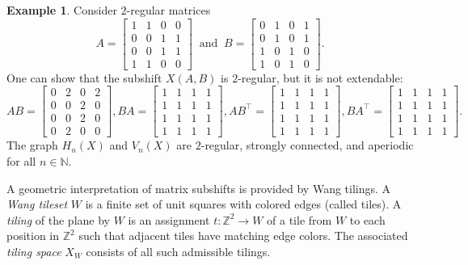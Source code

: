 \documentclass[12pt]{article}
\theoremstyle{definition}
\newtheorem{example}{Example}
\begin{document}
\begin{example}
Consider $2$-regular matrices
\[
A = \begin{bmatrix}
1 & 1 & 0 & 0 \\
0 & 0 & 1 & 1 \\
0 & 0 & 1 & 1 \\
1 & 1 & 0 & 0
\end{bmatrix} \ \mbox{ and } \
B = \begin{bmatrix}
0 & 1 & 0 & 1 \\
0 & 1 & 0 & 1 \\
1 & 0 & 1 & 0 \\
1 & 0 & 1 & 0
\end{bmatrix}.
\]
One can show that the subshift $X(A,B)$ is $2$-regular, but it is not extendable:
\[
AB = \begin{bmatrix}
0 & 2 & 0 & 2 \\
0 & 0 & 2 & 0 \\
0 & 0 & 2 & 0 \\
0 & 2 & 0 & 0
\end{bmatrix},
BA = \begin{bmatrix}
1 & 1 & 1 & 1 \\
1 & 1 & 1 & 1 \\
1 & 1 & 1 & 1 \\
1 & 1 & 1 & 1 
\end{bmatrix},
AB^\top = \begin{bmatrix}
1 & 1 & 1 & 1 \\
1 & 1 & 1 & 1 \\
1 & 1 & 1 & 1 \\
1 & 1 & 1 & 1 
\end{bmatrix},
BA^\top = \begin{bmatrix}
1 & 1 & 1 & 1 \\
1 & 1 & 1 & 1 \\
1 & 1 & 1 & 1 \\
1 & 1 & 1 & 1 
\end{bmatrix}.
\]
The graph $H_n(X)$ and $V_n(X)$ are $2$-regular, strongly connected, and aperiodic for all $n\in\mathbb{N}$.
\end{example}


A geometric interpretation of matrix subshifts is provided by Wang tilings.
A \textit{Wang tileset} $W$ is a finite set of unit squares with colored edges (called tiles). A \textit{tiling} of the plane by $W$ is an assignment $t:\mathbb{Z}^2\rightarrow W$ of a tile from $W$ to each position in $\mathbb{Z}^2$ such that adjacent tiles have matching edge colors. The associated \textit{tiling space} $X_W$ consists of all such admissible tilings.
\end{document}

